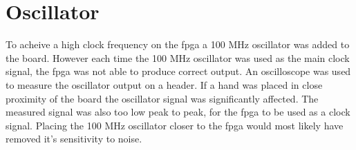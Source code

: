 \section{Oscillator}
To acheive a high clock frequency on the \gls{fpga} a 100 MHz oscillator was added to the board.
However each time the 100 MHz oscillator was used as the main clock signal,
the \gls{fpga} was not able to produce correct output.
An oscilloscope was used to measure the oscillator output on a header.
If a hand was placed in close proximity of the board the oscillator signal was significantly affected.
The measured signal was also too low peak to peak, for the \gls{fpga} to be used as a clock signal.
Placing the 100 MHz oscillator closer to the \gls{fpga} would most likely have removed it's sensitivity to noise.
